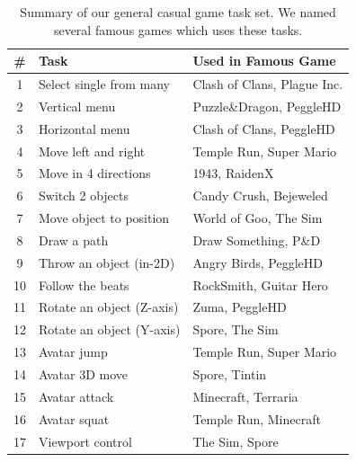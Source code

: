 \documentclass{sigchi}
\newcommand\tabhead[1]{\small\textbf{#1}}
\begin{document}
  \begin{table}
    \centering
    \begin{tabular}{|c|l|l|}
      \hline
      \tabhead{\#} &
      \multicolumn{1}{|p{0.4\columnwidth}|}{\centering\tabhead{Task}} &
      \multicolumn{1}{|p{0.45\columnwidth}|}{\centering\tabhead{Used in Famous Game}} \\
      \hline
      1 & Select single from many & Clash of Clans, Plague Inc.\\
      \hline
      2 & Vertical menu & Puzzle\&Dragon, PeggleHD \\
      \hline
      3 & Horizontal menu & Clash of Clans, PeggleHD\\
      \hline
      4 & Move left and right & Temple Run, Super Mario\\
      \hline
      5 & Move in 4 directions & 1943, RaidenX\\
      \hline
      6 & Switch 2 objects & Candy Crush, Bejeweled\\
      \hline
      7 & Move object to position & World of Goo, The Sim\\
      \hline
      8 & Draw a path & Draw Something, P\&D\\
      \hline
      9 & Throw an object (in-2D) & Angry Birds, PeggleHD\\
      \hline
      10 & Follow the beats & RockSmith, Guitar Hero\\
      \hline
      11 & Rotate an object (Z-axis) & Zuma, PeggleHD \\
      \hline
      12 & Rotate an object (Y-axis) & Spore, The Sim\\
      \hline
      13 & Avatar jump & Temple Run, Super Mario\\
      \hline
      14 & Avatar 3D move & Spore, Tintin\\
      \hline
      15 & Avatar attack & Minecraft, Terraria\\
      \hline
      16 & Avatar squat & Temple Run, Minecraft\\
      \hline
      17 & Viewport control & The Sim, Spore\\
      \hline

    \end{tabular}
    \caption{Summary of our general casual game task set. We named several famous games which uses these tasks.}
    \label{tab:table1}
  \end{table}
\end{document}
